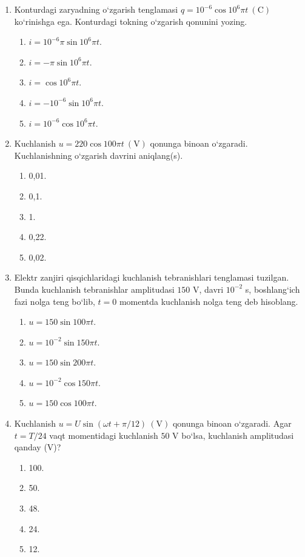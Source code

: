 \begin{enumerate}
\item Konturdagi zaryadning o‘zgarish tenglamasi $q=10^{-6}\cos10^6\pi t \ (\text{C})$ ko‘rinishga ega. Konturdagi tokning o‘zgarish qonunini yozing.
\begin{enumerate}[label=\Alph*)]
\item $i=10^{-6}\pi\sin10^6\pi t$.
\item $i=-\pi\sin10^6\pi t$.
\item $i=\cos10^6\pi t$.
\item $i=-10^{-6}\sin10^6\pi t$.
\item $i=10^{-6}\cos10^6\pi t$.
\end{enumerate}

\item Kuchlanish $u=220\cos100\pi t \ (\text{V})$ qonunga binoan o‘zgaradi. Kuchlanishning o‘zgarish davrini aniqlang(s).
\begin{enumerate}[label=\Alph*)]
\item 0,01.
\item 0,1.
\item 1.
\item 0,22.
\item 0,02.
\end{enumerate}

\item Elektr zanjiri qisqichlaridagi kuchlanish tebranishlari tenglamasi tuzilgan. Bunda kuchlanish tebranishlar amplitudasi $150$ V, davri $10^{-2}$ s, boshlang‘ich fazi nolga teng bo‘lib, $t=0$ momentda kuchlanish nolga teng deb hisoblang.
\begin{enumerate}[label=\Alph*)]
\item $u=150\sin100\pi t$.
\item $u=10^{-2}\sin150\pi t$.
\item $u=150\sin200\pi t$.
\item $u=10^{-2}\cos150\pi t$.
\item $u=150\cos100\pi t$.
\end{enumerate}

\item Kuchlanish $u=U\sin(\omega t+\pi/12)\ (\text{V})$ qonunga binoan o‘zgaradi. Agar $t=T/24$ vaqt momentidagi kuchlanish $50$ V bo‘lsa, kuchlanish amplitudasi qanday (V)?
\begin{enumerate}[label=\Alph*)]
\item 100.
\item 50.
\item 48.
\item 24.
\item 12.
\end{enumerate}


\end{enumerate}
